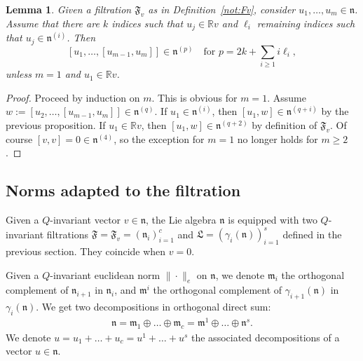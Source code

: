 \documentclass[11pt,leqno]{article}
\theoremstyle{plain}
\newtheorem{lemma}[theorem]{Lemma}
\theoremstyle{definition}
\theoremstyle{remark}
\numberwithin{equation}{section}
\begin{document}
\begin{lemma}\label{lem:commute}
Given a filtration $\mathfrak{F}_v$ as in Definition~\ref{not:Fv}, consider $u_1,\dots, u_m \in \mathfrak{n}$. Assume that there are $k$ indices such that $u_j \in \mathbb{R}v$ and $\ell_i$ remaining indices such that $u_j \in \mathfrak{n}^{(i)}$. Then 
\[
[u_1,\dots,[u_{m-1},u_m]] \in \mathfrak{n}^{(p)} \quad \textrm{for }p=2k+\sum_{i\ge 1}i\ell_i,
\] 
unless $m=1$ and $u_1\in \mathbb{R}v$.
\end{lemma}

\begin{proof}
Proceed by induction on $m$. This is obvious for $m=1$. Assume $w:=[u_2,\dots,[u_{m-1},u_m]] \in \mathfrak{n}^{(q)}$. If $u_1 \in \mathfrak{n}^{(i)}$, then $[u_1,w] \in \mathfrak{n}^{(q+i)}$ by the previous proposition. If $u_1 \in \mathbb{R}v$, then $[u_1,w] \in \mathfrak{n}^{(q+2)}$ by definition of $\mathfrak{F}_v$. Of course $[v,v]=0 \in \mathfrak{n}^{(4)}$, so the exception for $m=1$ no longer holds for $m\ge 2$.
\end{proof}

\subsection{Norms adapted to the filtration}

 
Given a $Q$-invariant vector $v\in \mathfrak{n}$, the Lie algebra $\mathfrak{n}$ is equipped with two $Q$-invariant filtrations $\mathfrak{F}=\mathfrak{F}_{v}=(\mathfrak{n}_i)_{i=1}^c$ and $\mathfrak{L}=(\gamma_i(\mathfrak{n}))_{i=1}^s$ defined in the previous section. They coincide when $v=0$. 

Given a $Q$-invariant euclidean norm $\|\cdot\|_e$ on $\mathfrak{n}$, we denote $\mathfrak{m}_i$ the orthogonal complement of $\mathfrak{n}_{i+1}$ in $\mathfrak{n}_i$, and $\mathfrak{m}^i$ the orthogonal complement of $\gamma_{i+1}(\mathfrak{n})$ in $\gamma_i(\mathfrak{n})$. We get two decompositions in orthogonal direct sum:
\begin{align}\label{eq:decomp}
\mathfrak{n}=\mathfrak{m}_1 \oplus \dots \oplus \mathfrak{m}_c=\mathfrak{m}^1 \oplus \dots \oplus \mathfrak{n}^s.
\end{align}
We denote $u=u_1+\dots+u_c=u^1+\dots+u^s$ the associated decompositions of a vector $u \in \mathfrak{n}$.
\end{document}
